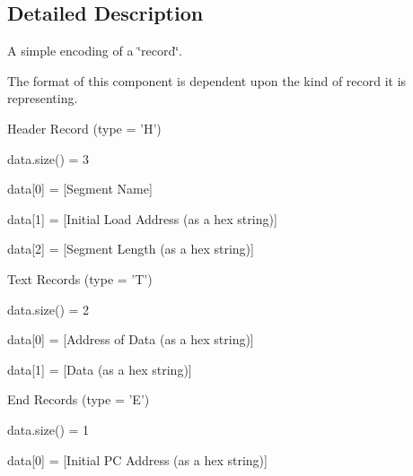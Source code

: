 \subsection{Detailed Description}
A simple encoding of a \char`\"{}record\char`\"{}. \begin{DoxyParagraph}{}
The format of this component is dependent upon the kind of record it is representing. 
\end{DoxyParagraph}
\begin{DoxyParagraph}{}
\begin{DoxyItemize}
\item Header Record (type = 'H') 
\begin{DoxyItemize}
\item data.size() = 3 
\begin{DoxyItemize}
\item data\mbox{[}0\mbox{]} = \mbox{[}Segment Name\mbox{]} 
\item data\mbox{[}1\mbox{]} = \mbox{[}Initial Load Address (as a hex string)\mbox{]} 
\item data\mbox{[}2\mbox{]} = \mbox{[}Segment Length (as a hex string)\mbox{]}
\end{DoxyItemize}
\end{DoxyItemize}\item Text Records (type = 'T') 
\begin{DoxyItemize}
\item data.size() = 2 
\begin{DoxyItemize}
\item data\mbox{[}0\mbox{]} = \mbox{[}Address of Data (as a hex string)\mbox{]} 
\item data\mbox{[}1\mbox{]} = \mbox{[}Data (as a hex string)\mbox{]}
\end{DoxyItemize}
\end{DoxyItemize}\item End Records (type = 'E') 
\begin{DoxyItemize}
\item data.size() = 1 
\begin{DoxyItemize}
\item data\mbox{[}0\mbox{]} = \mbox{[}Initial PC Address (as a hex string)\mbox{]}
\end{DoxyItemize}
\end{DoxyItemize}\end{DoxyItemize}

\end{DoxyParagraph}
